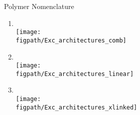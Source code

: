 \begin{activity}{Polymer Nomenclature}
\begin{exercises}
\begin{enumerate}
			\item \text{}\\ \texttt{[image: \\figpath/Exc\_architectures\_comb]}
			
			\item \text{}\\ \texttt{[image: \\figpath/Exc\_architectures\_linear]}
			
			\item \text{}\\ \texttt{[image: \\figpath/Exc\_architectures\_xlinked]}
			
		\end{enumerate}
	
\end{exercises}

	
\end{activity}